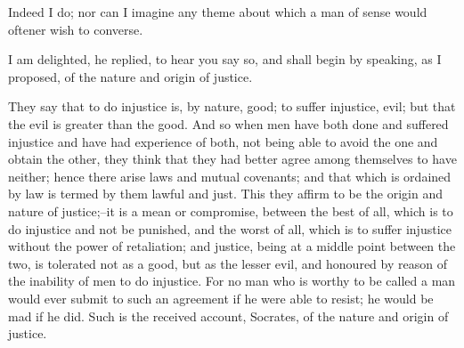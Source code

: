 Indeed I do; nor can I imagine any theme about which a man of sense
would oftener wish to converse.

I am delighted, he replied, to hear you say so, and shall begin by
speaking, as I proposed, of the nature and origin of justice.

They say that to do injustice is, by nature, good; to suffer injustice,
evil; but that the evil is greater than the good. And so when men have
both done and suffered injustice and have had experience of both, not
being able to avoid the one and obtain the other, they think that they
had better agree among themselves to have neither; hence there arise
laws and mutual covenants; and that which is ordained by law is termed
by them lawful and just. This they affirm to be the origin and nature of
justice;--it is a mean or compromise, between the best of all, which is
to do injustice and not be punished, and the worst of all, which is to
suffer injustice without the power of retaliation; and justice, being at
a middle point between the two, is tolerated not as a good, but as
the lesser evil, and honoured by reason of the inability of men to do
injustice. For no man who is worthy to be called a man would ever submit
to such an agreement if he were able to resist; he would be mad if he
did. Such is the received account, Socrates, of the nature and origin of
justice.


